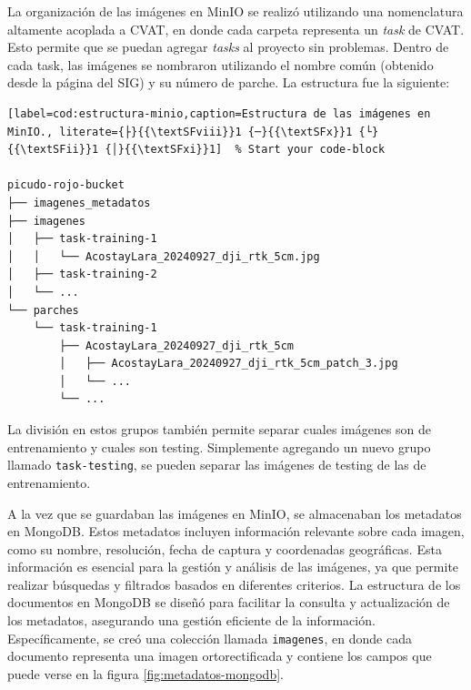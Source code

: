 La organización de las imágenes en MinIO se realizó utilizando una nomenclatura altamente acoplada a CVAT, en donde cada carpeta representa un \textit{task} de CVAT. Esto permite que se puedan agregar \textit{tasks} al proyecto sin problemas. Dentro de cada task, las imágenes se nombraron utilizando el nombre común (obtenido desde la página del SIG) y su número de parche. La estructura fue la siguiente:

\begin{lstlisting}[label=cod:estructura-minio,caption=Estructura de las imágenes en MinIO., literate={├}{{\textSFviii}}1 {─}{{\textSFx}}1 {└}{{\textSFii}}1 {│}{{\textSFxi}}1]  % Start your code-block

picudo-rojo-bucket
├── imagenes_metadatos
├── imagenes
│   ├── task-training-1
│   │   └── AcostayLara_20240927_dji_rtk_5cm.jpg
│   ├── task-training-2
│   └── ...
└── parches
    └── task-training-1
        ├── AcostayLara_20240927_dji_rtk_5cm
        │   ├── AcostayLara_20240927_dji_rtk_5cm_patch_3.jpg
        │   └── ...
        └── ...

\end{lstlisting}

La división en estos grupos también permite separar cuales imágenes son de entrenamiento y cuales son testing. Simplemente agregando un nuevo grupo llamado \lstinline[language=sh]|task-testing|, se pueden separar las imágenes de testing de las de entrenamiento.

A la vez que se guardaban las imágenes en MinIO, se almacenaban los metadatos en MongoDB. Estos metadatos incluyen información relevante sobre cada imagen, como su nombre, resolución, fecha de captura y coordenadas geográficas. Esta información es esencial para la gestión y análisis de las imágenes, ya que permite realizar búsquedas y filtrados basados en diferentes criterios. La estructura de los documentos en MongoDB se diseñó para facilitar la consulta y actualización de los metadatos, asegurando una gestión eficiente de la información. Específicamente, se creó una colección llamada \lstinline[language=sh]|imagenes|, en donde cada documento representa una imagen ortorectificada y contiene los campos que puede verse en la figura \ref{fig:metadatos-mongodb}.


